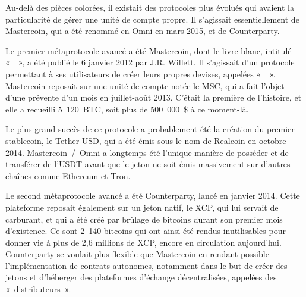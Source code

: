 Au-delà des pièces colorées, il existait des protocoles plus évolués qui avaient la particularité de gérer une unité de compte propre. Il s'agissait essentiellement de Mastercoin, qui a été renommé en Omni en mars 2015, et de Counterparty.

Le premier métaprotocole avancé a été Mastercoin, dont le livre blanc, intitulé «~~», a été publié le 6 janvier 2012 par J.R. Willett. Il s'agissait d'un protocole permettant à ses utilisateurs de créer leurs propres devises, appelées «~~». Mastercoin reposait sur une unité de compte notée le MSC, qui a fait l'objet d'une prévente d'un mois en juillet-août 2013. C'était la première  de l'histoire, et elle a recueilli 5~120~BTC, soit plus de 500~000~\$ à ce moment-là.

Le plus grand succès de ce protocole a probablement été la création du premier stablecoin, le Tether USD, qui a été émis sous le nom de Realcoin en octobre 2014. Mastercoin~/~Omni a longtemps été l'unique manière de posséder et de transférer de l'USDT avant que le jeton ne soit émis massivement sur d'autres chaînes comme Ethereum et Tron.

Le second métaprotocole avancé a été Counterparty, lancé en janvier 2014. Cette plateforme reposait également sur un jeton natif, le XCP, qui lui servait de carburant, et qui a été créé par brûlage de bitcoins durant son premier mois d'existence. Ce sont 2~140 bitcoins qui ont ainsi été rendus inutilisables pour donner vie à plus de 2,6 millions de XCP, encore en circulation aujourd'hui. Counterparty se voulait plus flexible que Mastercoin en rendant possible l'implémentation de contrats autonomes, notamment dans le but de créer des jetons et d'héberger des plateformes d'échange décentralisées, appelées des «~distributeurs~».

